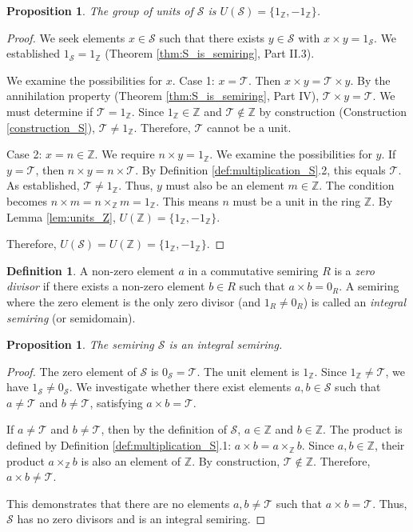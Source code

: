 \documentclass[11pt, a4paper]{article}
\theoremstyle{plain}
\newtheorem{proposition}[theorem]{Proposition}
\theoremstyle{definition}
\newtheorem{definition}[theorem]{Definition}
\numberwithin{equation}{section}
\newcommand{\Z}{\mathbb{Z}}
\newcommand{\Tobj}{\mathcal{T}} %
\newcommand{\SemiringS}{\mathcal{S}}
\begin{document}
\begin{proposition}\label{prop:units_S}
The group of units of $\SemiringS$ is $U(\SemiringS) = \{1_{\Z}, -1_{\Z}\}$.
\end{proposition}
\begin{proof}
We seek elements $x \in \SemiringS$ such that there exists $y \in \SemiringS$ with $x\times y = 1_{\SemiringS}$. We established $1_{\SemiringS}=1_{\Z}$ (Theorem \ref{thm:S_is_semiring}, Part II.3).

We examine the possibilities for $x$.
Case 1: $x=\Tobj$. Then $x\times y = \Tobj\times y$. By the annihilation property (Theorem \ref{thm:S_is_semiring}, Part IV), $\Tobj\times y = \Tobj$. We must determine if $\Tobj = 1_{\Z}$. Since $1_{\Z} \in \Z$ and $\Tobj \notin \Z$ by construction (Construction \ref{construction_S}), $\Tobj \neq 1_{\Z}$. Therefore, $\Tobj$ cannot be a unit.

Case 2: $x=n \in \Z$. We require $n\times y = 1_{\Z}$.
We examine the possibilities for $y$.
If $y=\Tobj$, then $n\times y = n\times\Tobj$. By Definition \ref{def:multiplication_S}.2, this equals $\Tobj$. As established, $\Tobj \neq 1_{\Z}$.
Thus, $y$ must also be an element $m \in \Z$. The condition becomes $n\times m = n\times_{\Z} m = 1_{\Z}$. This means $n$ must be a unit in the ring $\Z$. By Lemma \ref{lem:units_Z}, $U(\Z) = \{1_{\Z}, -1_{\Z}\}$.

Therefore, $U(\SemiringS) = U(\Z) = \{1_{\Z}, -1_{\Z}\}$.
\end{proof}

\begin{definition}
A non-zero element $a$ in a commutative semiring $R$ is a \emph{zero divisor} if there exists a non-zero element $b \in R$ such that $a\times b = 0_R$. A semiring where the zero element is the only zero divisor (and $1_R \neq 0_R$) is called an \emph{integral semiring} (or semidomain).
\end{definition}

\begin{proposition}\label{prop:no_zero_divisors}
The semiring $\SemiringS$ is an integral semiring.
\end{proposition}
\begin{proof}
The zero element of $\SemiringS$ is $0_{\SemiringS}=\Tobj$. The unit element is $1_{\Z}$. Since $1_{\Z} \neq \Tobj$, we have $1_{\SemiringS} \neq 0_{\SemiringS}$.
We investigate whether there exist elements $a, b \in \SemiringS$ such that $a \neq \Tobj$ and $b \neq \Tobj$, satisfying $a\times b = \Tobj$.

If $a \neq \Tobj$ and $b \neq \Tobj$, then by the definition of $\SemiringS$, $a \in \Z$ and $b \in \Z$.
The product is defined by Definition \ref{def:multiplication_S}.1: $a\times b = a\times_{\Z} b$.
Since $a, b \in \Z$, their product $a\times_{\Z} b$ is also an element of $\Z$.
By construction, $\Tobj \notin \Z$.
Therefore, $a\times b \neq \Tobj$.

This demonstrates that there are no elements $a, b \neq \Tobj$ such that $a\times b = \Tobj$. Thus, $\SemiringS$ has no zero divisors and is an integral semiring.
\end{proof}
\end{document}
